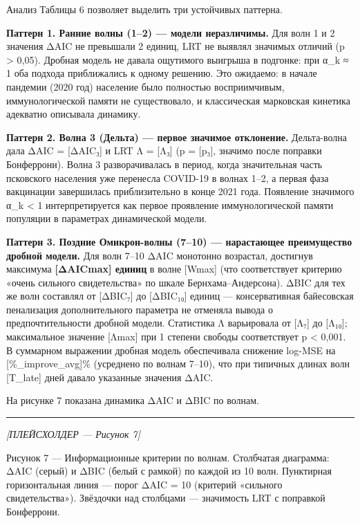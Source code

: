 \documentclass[12pt]{article}
\begin{document}
Анализ Таблицы 6 позволяет выделить три устойчивых паттерна.

\textbf{Паттерн 1. Ранние волны (1--2) --- модели неразличимы.} Для волн
1 и 2 значения ΔAIC не превышали 2 единиц, LRT не выявлял значимых
отличий (p \textgreater{} 0,05). Дробная модель не давала ощутимого
выигрыша в подгонке: при α\_k ≈ 1 оба подхода приближались к одному
решению. Это ожидаемо: в начале пандемии (2020 год) население было
полностью восприимчивым, иммунологической памяти не существовало, и
классическая марковская кинетика адекватно описывала динамику.

\textbf{Паттерн 2. Волна 3 (Дельта) --- первое значимое отклонение.}
Дельта-волна дала ΔAIC = {[}ΔAIC₃{]} и LRT Λ = {[}Λ₃{]} (p = {[}p₃{]},
значимо после поправки Бонферрони). Волна 3 разворачивалась в период,
когда значительная часть псковского населения уже перенесла COVID-19 в
волнах 1--2, а первая фаза вакцинации завершилась приблизительно в конце
2021 года. Появление значимого α\_k \textless{} 1 интерпретируется как
первое проявление иммунологической памяти популяции в параметрах
динамической модели.

\textbf{Паттерн 3. Поздние Омикрон-волны (7--10) --- нарастающее
преимущество дробной модели.} Для волн 7--10 ΔAIC монотонно возрастал,
достигнув максимума \textbf{{[}ΔAICmax{]} единиц} в волне {[}Wmax{]}
(что соответствует критерию «очень сильного свидетельства» по шкале
Бернхама--Андерсона). ΔBIC для тех же волн составлял от {[}ΔBIC₇{]} до
{[}ΔBIC₁₀{]} единиц --- консервативная байесовская пенализация
дополнительного параметра не отменяла вывода о предпочтительности
дробной модели. Статистика Λ варьировала от {[}Λ₇{]} до {[}Λ₁₀{]};
максимальное значение {[}Λmax{]} при 1 степени свободы соответствует p
\textless{} 0,001. В суммарном выражении дробная модель обеспечивала
снижение log-MSE на {[}\%\_improve\_avg{]}\% (усреднено по волнам
7--10), что при типичных длинах волн {[}T\_late{]} дней давало указанные
значения ΔAIC.

На рисунке 7 показана динамика ΔAIC и ΔBIC по волнам.

\begin{center}\rule{0.5\linewidth}{0.5pt}\end{center}

\emph{{[}ПЛЕЙСХОЛДЕР --- Рисунок 7{]}}

Рисунок 7 --- Информационные критерии по волнам. Столбчатая диаграмма:
ΔAIC (серый) и ΔBIC (белый с рамкой) по каждой из 10 волн. Пунктирная
горизонтальная линия --- порог ΔAIC = 10 (критерий «сильного
свидетельства»). Звёздочки над столбцами --- значимость LRT с поправкой
Бонферрони.
\end{document}
